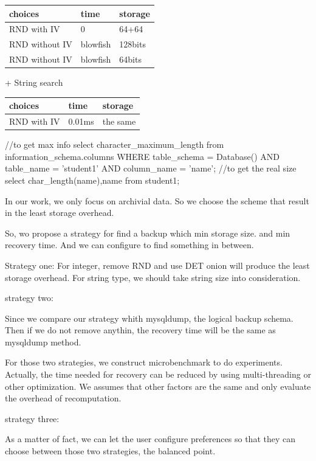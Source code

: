 \begin{tabular}{ | l | l | l |} 
\hline choices & time & storage
\\ \hline RND with IV & 0 & 64+64
\\ \hline RND without IV & blowfish & 128bits
\\ \hline RND without IV & blowfish & 64bits
\\ \hline \end{tabular}

+ String search 

\begin{tabular}{| l | l | l |} 
\hline choices & time & storage
\\ \hline RND with IV & 0.01ms & the same
\\ \hline \end{tabular}


//to get max info
select character\_maximum\_length  from information\_schema.columns WHERE  table\_schema = Database() AND table\_name = 'student1' AND column\_name = 'name';
//to get the real size
select char\_length(name),name from student1;


In our work, we only focus on archivial data. So we choose the scheme that result in the least storage overhead.


So, wo propose a strategy for find a backup which min storage size. and min recovery time. And we can configure to find something in between. 


Strategy one:
For integer, remove RND and use DET onion will produce the least storage overhead. For string type, we should take string size into consideration. 



strategy two:

Since we compare our strategy whith mysqldump, the logical backup schema. Then if we do not remove anythin, the recovery time will be the same as mysqldump method. 


For those two strategies, we construct microbenchmark to do experiments. Actually, the time needed for recovery can be reduced by using multi-threading or other optimization. We assumes that other factors are the same and only evaluate the overhead of recomputation. 



strategy three:

As a matter of fact, we can let the user configure preferences so that they can choose between those two strategies, the balanced point.








